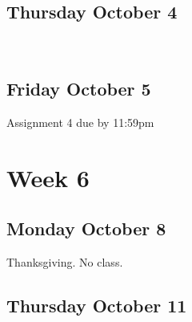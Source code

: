 \documentclass[]{book}
\let\originaltabular\tabular
\let\endoriginaltabular\endtabular
\renewenvironment{tabular}[1]{%
  \begingroup%
  \centering%
  \originaltabular{#1}}%
  {\endoriginaltabular\endgroup}
\theoremstyle{definition}
\theoremstyle{definition}
\theoremstyle{definition}
\theoremstyle{remark}
\begin{document}
\subsection{Thursday October 4}\label{thursday-october-4}

\begin{table}[H]
\centering
\begin{tabular}{l}
\hline
\\
\hline
\end{tabular}
\end{table}

\subsection{Friday October 5}\label{friday-october-5}

\begin{table}[H]
\centering
\begin{tabular}{l}
\hline
Assignment 4 due by 11:59pm\\
\hline
\end{tabular}
\end{table}

\section{Week 6}\label{week-6}

\subsection{Monday October 8}\label{monday-october-8}

\begin{table}[H]
\centering
\begin{tabular}{l}
\hline
Thanksgiving. No class.\\
\hline
\end{tabular}
\end{table}

\subsection{Thursday October 11}\label{thursday-october-11}

\begin{table}[H]
\centering
\begin{tabular}{l}
\hline
\\
\hline
\end{tabular}
\end{table}
\end{document}
